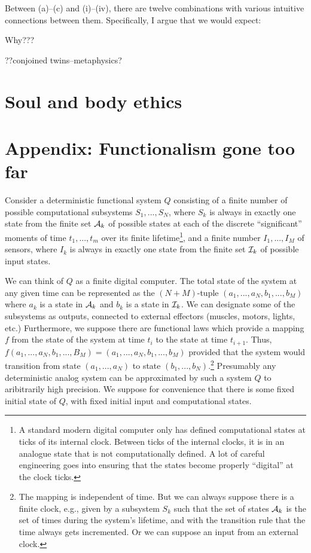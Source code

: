Between (a)--(c) and (i)--(iv), there are twelve combinations with various intuitive connections between them. Specifically,
I argue that we would expect:

Why???

??conjoined twins--metaphysics?


\section{Soul and body ethics}
\section*{Appendix: Functionalism gone too far}
Consider a deterministic functional system $Q$ consisting of a 
finite number of possible computational subsystems $S_1,...,S_N$, where $S_k$ is always in exactly one state from the finite set $\mathcal A_k$
of possible states at each of the discrete ``significant'' moments of time $t_1,...,t_m$ over its finite lifetime\footnote{A standard modern digital computer only has defined 
computational states at ticks of its internal clock. Between ticks of the internal clocks, it is in an analogue state that is not
computationally defined. A lot of careful engineering goes into ensuring that the states become properly ``digital'' at the clock ticks.}, and 
a finite number $I_1,...,I_M$ of sensors, where $I_k$ is always in exactly one state from the finite set $\mathcal I_k$ of possible input
states. 

We can think of $Q$ as a finite digital computer. The total state of the system at any given time can be represented as the
$(N+M)$-tuple $(a_1,...,a_N,b_1,...,b_M)$ where $a_k$ is a state in $\mathcal A_k$ and $b_k$ is a state in $\mathcal I_k$. We can designate some of
the subsystems as outputs, connected to external effectors (muscles, motors, lights, etc.)  Furthermore, we suppose there are functional laws which provide a 
mapping $f$ from the state of the system at time $t_i$ to the state at time $t_{i+1}$. Thus, $f(a_1,...,a_N,b_1,...,B_M)= (a_1,...,a_N,b_1,...,b_M)$ 
provided that the system would transition from state $(a_1,...,a_N)$ to state $(b_1,...,b_N)$.\footnote{The mapping is independent of time. But we 
can always suppose there is a finite clock, e.g., given by a subsystem $S_k$ such that the set of states $\mathcal A_k$ is
the set of times during the system's lifetime, and with the transition rule that the time always gets incremented. Or we can suppose an input
from an external clock.} Presumably any deterministic analog system can be approximated by such a system $Q$ to aribitrarily high precision.
We suppose for convenience that there is some fixed initial state of $Q$, with fixed initial input and computational states.

